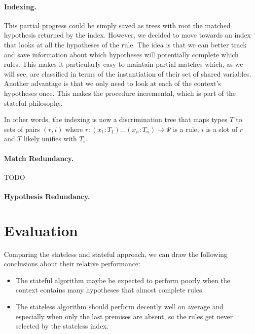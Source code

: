 \documentclass[runningheads]{llncs}
\newcommand{\jcom}[1]{{\color{orange}{Jannis: #1}} }
\begin{document}
\paragraph{Indexing.}
\jcom{TODO adjust}
This partial progress could be simply saved as trees with root the matched hypothesis returned by the index.
However, we decided to move towards an index that looks at all the hypotheses of the rule.
The idea is that we can better track and save information about which hypotheses will potentially complete which rules.
This makes it particularly easy to maintain partial matches which, as we will see, are classified in terms of the instantiation of their set of shared variables.
Another advantage is that we only need to look at each of the context's hypotheses once.
This makes the procedure incremental, which is part of the stateful philosophy.

In other words, the indexing is now a discrimination tree that maps types $T$ to sets of pairs $(r,i)$ where $r : (x_1 : T_1) \dots (x_n : T_n) \to \Psi$ is a rule, $i$ is a slot of $r$ and $T$ likely unifies with $T_i$.

\paragraph{Match Redundancy.}
TODO

\paragraph{Hypothesis Redundancy.}
\jcom{Mention here that we also use this for the naive algorithm.}

\section{Evaluation}%
\label{sec:evaluation}

Comparing the stateless and stateful approach, we can draw the following conclusions about their relative performance:

\begin{itemize}
    \item The stateful algorithm maybe be expected to perform poorly when the context contains many hypotheses that almost complete rules.
    \item The stateless algorithm should perform decently well on average and especially when only the last premises are absent, so the rules get never selected by the stateless index.
\end{itemize}
\end{document}
